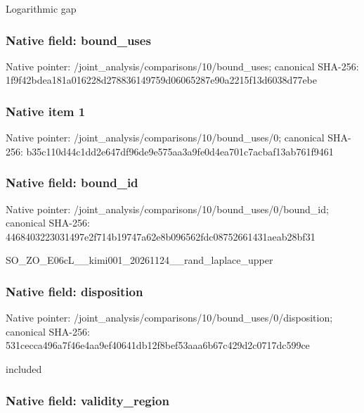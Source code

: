 \documentclass[10pt,a4paper]{article}
\begin{document}
Logarithmic gap


\subsubsection{Native field: bound\_uses}


Native pointer: /joint\_analysis/comparis\allowbreak{}ons/10/bound\_uses; canonical SHA-256: 1f9f42bdea181a016228d278\allowbreak{}836149759d06065287e90a22\allowbreak{}15f13d6038d77ebe



\subsubsection{Native item 1}


Native pointer: /joint\_analysis/comparis\allowbreak{}ons/10/bound\_uses/0; canonical SHA-256: b35c110d44c1dd2e647df96d\allowbreak{}e9e575aa3a9fe0d4ea701c7a\allowbreak{}cbaf13ab761f9461



\subsubsection{Native field: bound\_id}


Native pointer: /joint\_analysis/comparis\allowbreak{}ons/10/bound\_uses/0/boun\allowbreak{}d\_id; canonical SHA-256: 4468403223031497e2f714b1\allowbreak{}9747a62e8b096562fdc08752\allowbreak{}661431aeab28bf31


SO\_ZO\_E06cL\_\_kimi001\_202\allowbreak{}61124\_\_rand\_laplace\_uppe\allowbreak{}r


\subsubsection{Native field: disposition}


Native pointer: /joint\_analysis/comparis\allowbreak{}ons/10/bound\_uses/0/disp\allowbreak{}osition; canonical SHA-256: 531cecca496a7f46e4aa9ef4\allowbreak{}0641db12f8bef53aaa6b67c4\allowbreak{}29d2c0717dc599ce


included


\subsubsection{Native field: validity\_region}
\end{document}
